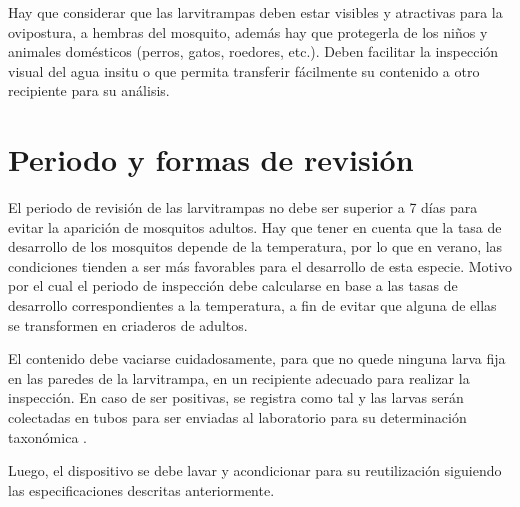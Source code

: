 Hay que considerar que las larvitrampas deben estar visibles y atractivas para la ovipostura, a
hembras del mosquito, además hay que protegerla de los niños y animales domésticos (perros, gatos,
roedores, etc.). Deben facilitar la inspección visual del agua insitu o que permita transferir
fácilmente su contenido a otro recipiente para su análisis.

\section{Periodo y formas de revisión}
El periodo de revisión de las larvitrampas no debe ser superior a 7 días para evitar la aparición
de mosquitos adultos. Hay que tener en cuenta que la tasa de desarrollo de los mosquitos depende
de la temperatura, por lo que en verano, las condiciones tienden a ser más favorables para el
desarrollo de esta especie. Motivo por el cual el periodo de inspección debe calcularse en base a
las tasas de desarrollo correspondientes a la temperatura, a fin de evitar que alguna de ellas se
transformen en criaderos de adultos.

El contenido debe vaciarse cuidadosamente, para que no quede ninguna larva fija en las paredes de
la larvitrampa, en un recipiente adecuado para realizar la inspección. En caso de ser positivas,
se registra como tal y las larvas serán colectadas en tubos para ser enviadas al laboratorio para
su determinación taxonómica \cite{manualControlArg2009}.

Luego, el dispositivo se debe lavar y acondicionar para su reutilización siguiendo las
especificaciones descritas anteriormente.
